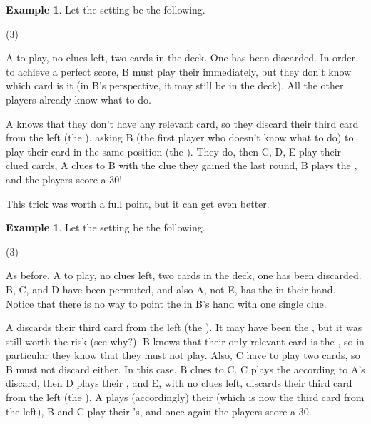 \documentclass[a4paper]{article}
\theoremstyle{plain}
\theoremstyle{definition}
\newtheorem{example}[theorem]{Example}
\begin{document}
\begin{example}
	
	Let the setting be the following.
	
	\begin{tasks}(3)
		\task[+]      
		\task[A]    
		\task[B]    
		\task[C]    
		\task[D]    
		\task[E]    
	\end{tasks}
	
	A to play, no clues left, two cards in the deck. One  has been discarded. In order to achieve a perfect score, B must play their  immediately, but they don't know which card is it (in B's perspective, it may still be in the deck). All the other players already know what to do.
	
	A knows that they don't have any relevant card, so they discard their third card from the left (the ), asking B (the first player who doesn't know what to do) to play their card in the same position (the ). They do, then C, D, E play their clued cards, A clues  to B with the clue they gained the last round, B plays the , and the players score a 30!
\end{example}

This trick was worth a full point, but it can get even better. 

\begin{example}
	
	Let the setting be the following.
	
	\begin{tasks}(3)
		\task[+]      
		\task[A]    
		\task[B]    
		\task[C]    
		\task[D]    
		\task[E]    
	\end{tasks}
	
	As before, A to play, no clues left, two cards in the deck, one  has been discarded. B, C, and D have been permuted, and also A, not E, has the  in their hand. Notice that there is no way to point the  in B's hand with one single clue.
	
	A discards their third card from the left (the ). It may have been the , but it was still worth the risk (see why?). B knows that their only relevant card is the , so in particular they know that they must not play. Also, C have to play two cards, so B must not discard either. In this case, B clues  to C. C plays the  according to A's discard, then D plays their , and E, with no clues left, discards their third card from the left (the ). A plays (accordingly) their  (which is now the third card from the left), B and C play their 's, and once again the players score a 30.
\end{example}
\end{document}
